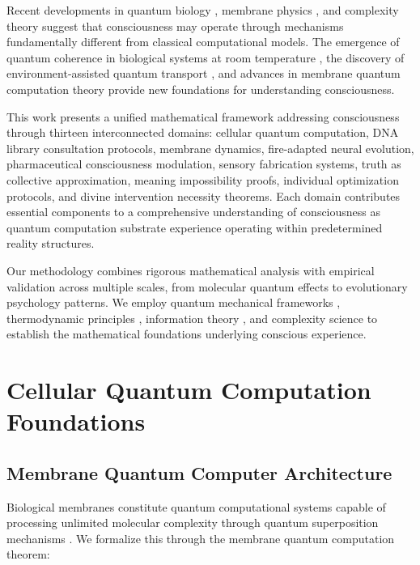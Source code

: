 \documentclass[12pt,a4paper]{article}
\begin{document}
Recent developments in quantum biology \citep{lambert2013quantum}, membrane physics \citep{heimburg2005thermodynamic}, and complexity theory \citep{mitchell2009complexity} suggest that consciousness may operate through mechanisms fundamentally different from classical computational models. The emergence of quantum coherence in biological systems at room temperature \citep{engel2007evidence, mohseni2008environment}, the discovery of environment-assisted quantum transport \citep{rebentrost2009environment}, and advances in membrane quantum computation theory \citep{tegmark2000importance} provide new foundations for understanding consciousness.

This work presents a unified mathematical framework addressing consciousness through thirteen interconnected domains: cellular quantum computation, DNA library consultation protocols, membrane dynamics, fire-adapted neural evolution, pharmaceutical consciousness modulation, sensory fabrication systems, truth as collective approximation, meaning impossibility proofs, individual optimization protocols, and divine intervention necessity theorems. Each domain contributes essential components to a comprehensive understanding of consciousness as quantum computation substrate experience operating within predetermined reality structures.

Our methodology combines rigorous mathematical analysis with empirical validation across multiple scales, from molecular quantum effects to evolutionary psychology patterns. We employ quantum mechanical frameworks \citep{schrodinger1935present}, thermodynamic principles \citep{prigogine1984order}, information theory \citep{shannon1948mathematical}, and complexity science \citep{holland1995hidden} to establish the mathematical foundations underlying conscious experience.

\section{Cellular Quantum Computation Foundations}

\subsection{Membrane Quantum Computer Architecture}

Biological membranes constitute quantum computational systems capable of processing unlimited molecular complexity through quantum superposition mechanisms \citep{olaya2008quantum}. We formalize this through the membrane quantum computation theorem:
\end{document}
